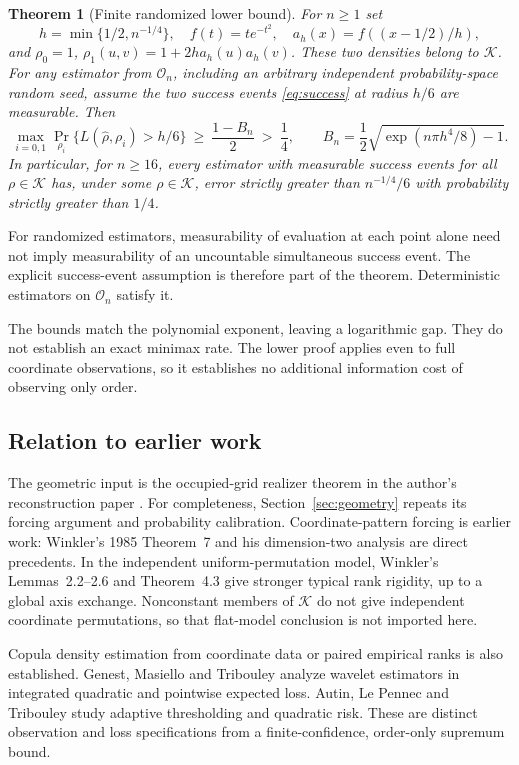 \documentclass[11pt]{article}
\newtheorem{theorem}{Theorem}[section]
\theoremstyle{remark}
\newcommand{\K}{\mathcal K}
\begin{document}
\begin{theorem}[Finite randomized lower bound]\label{thm:lower}
For $n\ge1$ set
\[
 h=\min\{1/2,n^{-1/4}\},\quad f(t)=t e^{-t^2},\quad
 a_h(x)=f((x-1/2)/h),
\]
and $\rho_0=1$, $\rho_1(u,v)=1+2h a_h(u)a_h(v)$.
These two densities belong to $\K$. For any estimator from
$\mathcal O_n$, including an arbitrary independent probability-space
random seed, assume the two success events \eqref{eq:success} at radius
$h/6$ are measurable. Then
\begin{equation}\label{eq:lower}
 \max_{i=0,1}\Pr_{\rho_i}\{L(\widehat\rho,\rho_i)>h/6\}
 \ \ge\ \frac{1-B_n}{2}\ >\ \frac14,\qquad
 B_n=\frac12\sqrt{\exp(n\pi h^4/8)-1}.
\end{equation}
In particular, for $n\ge16$, every estimator with measurable success
events for all $\rho\in\K$ has, under some $\rho\in\K$, error strictly
greater than $n^{-1/4}/6$ with probability strictly greater than $1/4$.
\end{theorem}
For randomized estimators, measurability of evaluation at each point
alone need not imply measurability of an uncountable simultaneous
success event. The explicit success-event assumption is therefore part
of the theorem. Deterministic estimators on $\mathcal O_n$ satisfy it.

The bounds match the polynomial exponent, leaving a logarithmic gap.
They do not establish an exact minimax rate. The lower proof applies
even to full coordinate observations, so it establishes no additional
information cost of observing only order.

\subsection{Relation to earlier work}
The geometric input is the occupied-grid realizer theorem in the
author's reconstruction paper \cite{Reconstruction}. For completeness,
Section~\ref{sec:geometry} repeats its forcing argument and probability
calibration. Coordinate-pattern forcing is earlier work: Winkler's
1985 Theorem~7 and his dimension-two analysis
\cite{Winkler1985,Winkler} are direct precedents. In the independent
uniform-permutation model, Winkler's Lemmas~2.2--2.6 and Theorem~4.3
give stronger typical rank rigidity, up to a global axis exchange.
Nonconstant members of $\K$ do not give independent coordinate
permutations, so that flat-model conclusion is not imported here.

Copula density estimation from coordinate data or paired empirical
ranks is also established. Genest, Masiello and Tribouley
\cite{Genest} analyze wavelet estimators in integrated quadratic and
pointwise expected loss. Autin, Le Pennec and Tribouley \cite{Autin}
study adaptive thresholding and quadratic risk. These are distinct
observation and loss specifications from a finite-confidence,
order-only supremum bound.
\end{document}

